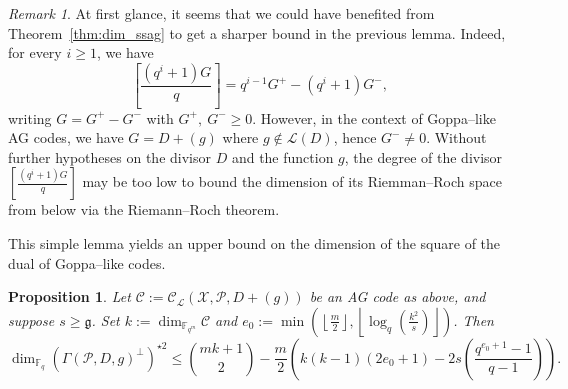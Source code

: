 \documentclass[a4paper]{amsart}
\newtheorem{proposition}[thm]{Proposition}
\theoremstyle{definition}
\theoremstyle{remark}
\newtheorem{remark}[thm]{Remark}
\newcommand{\calP}{\mathcal{P}}
\newcommand{\calL}{\mathcal{L}}
\newcommand{\calC}{\mathcal{C}}
\newcommand{\calX}{\mathcal{X}}
\newcommand{\fqm}{\mathbb{F}_{q^m}}
\newcommand{\fq}{\mathbb{F}_{q}}
\begin{document}
\begin{remark}\label{rmk:improvements}
	At first glance, it seems that we could have benefited from Theorem~\ref{thm:dim_ssag} to get a sharper bound in the previous lemma. Indeed, for every $i \geq 1$, we have 
	\[\left[\frac{(q^i+1)G}{q}\right]=q^{i-1}G^+ - (q^i+1)G^-,\]
	writing $G=G^+-G^-$ with $G^+, \: G^- \geq 0$. However, in the context of Goppa--like AG codes, we have $G=D+(g)$ where $g \notin \calL(D)$, hence $G^- \neq 0$. Without further hypotheses on the divisor $D$ and the function $g$, the degree of the divisor $\left[\frac{(q^i+1)G}{q}\right]$ may be too low to bound the dimension of its Riemman--Roch space from below via the Riemann--Roch theorem.
\end{remark}

This simple lemma yields an upper bound on the dimension of the square of the dual of Goppa--like codes.
\begin{proposition} \label{prop:bound_dim_using_inclusions}
    Let $\calC := \calC_{\calL}(\calX,\calP,D+(g))$ be an AG code as above, and suppose $s \geq \mathfrak{g}$. Set $k := \dim_{\fqm}\calC$ and  $e_0 := \min\left(\left\lfloor \frac{m}{2} \right\rfloor,\left\lfloor \log_q\left(\frac{k^2}{s}\right)\right\rfloor\right)$. Then
    $$\dim_{\fq} (\Gamma(\calP,D,g)^{\perp})^{\star 2} \leq \binom{mk+1}{2} - \dfrac{m}{2}\left(k(k-1)(2e_0+1)-2s\left(\dfrac{q^{e_0+1}-1}{q-1}\right)\right).$$
\end{proposition}
\end{document}
